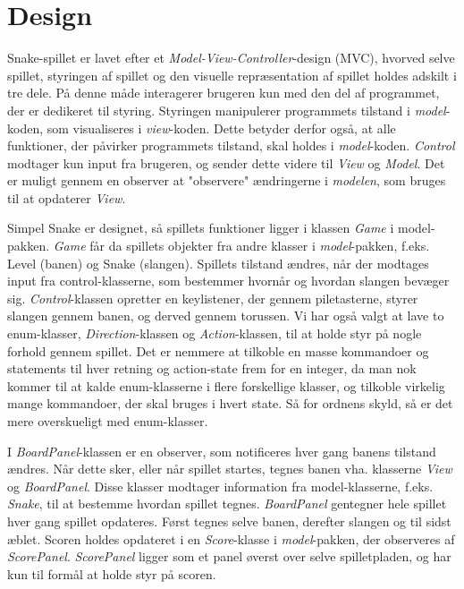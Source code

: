 \section{Design}
Snake-spillet er lavet efter et \textit{Model-View-Controller}-design (MVC), hvorved selve spillet, styringen af spillet og den visuelle repræsentation af spillet holdes adskilt i tre dele. På denne måde interagerer brugeren kun med den del af programmet, der er dedikeret til styring. Styringen manipulerer programmets tilstand i \textit{model}-koden, som visualiseres i \textit{view}-koden. Dette betyder derfor også, at alle funktioner, der påvirker programmets tilstand, skal holdes i \textit{model}-koden. \textit{Control} modtager kun input fra brugeren, og sender dette videre til \textit{View} og \textit{Model}. Det er muligt gennem en observer at "observere" ændringerne i \textit{modelen}, som bruges til at opdaterer \textit{View}.

Simpel Snake er designet, så spillets funktioner ligger i klassen \textit{Game} i model-pakken. \textit{Game} får da spillets objekter fra andre klasser i \textit{model}-pakken, f.eks. Level (banen) og Snake (slangen). Spillets tilstand ændres, når der modtages input fra control-klasserne, som bestemmer hvornår og hvordan slangen bevæger sig. \textit{Control}-klassen opretter en keylistener, der gennem piletasterne, styrer slangen gennem banen, og derved gennem torussen. Vi har også valgt at lave to enum-klasser, \textit{Direction}-klassen og \textit{Action}-klassen, til at holde styr på nogle forhold gennem spillet. Det er nemmere at tilkoble en masse kommandoer og statements til hver retning og action-state frem for en integer, da man nok kommer til at kalde enum-klasserne i flere forskellige klasser, og tilkoble virkelig mange kommandoer, der skal bruges i hvert state. Så for ordnens skyld, så er det mere overskueligt med enum-klasser.

I \textit{BoardPanel}-klassen er en observer, som notificeres hver gang banens tilstand ændres. Når dette sker, eller når spillet startes, tegnes banen vha. klasserne \textit{View} og \textit{BoardPanel}. Disse klasser modtager information fra model-klasserne, f.eks. \textit{Snake}, til at bestemme hvordan spillet tegnes. \textit{BoardPanel} gentegner hele spillet hver gang spillet opdateres. Først tegnes selve banen, derefter slangen og til sidst æblet. 
Scoren holdes opdateret i en \textit{Score}-klasse i \textit{model}-pakken, der observeres af \textit{ScorePanel}. \textit{ScorePanel} ligger som et panel øverst over selve spilletpladen, og har kun til formål at holde styr på scoren.

